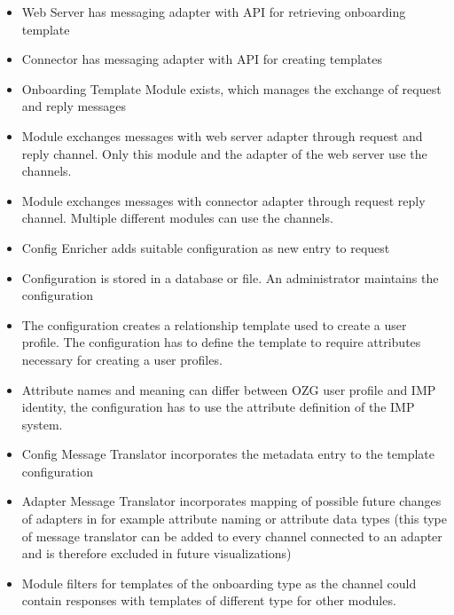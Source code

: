 \begin{itemize}
    \item Web Server has messaging adapter with API for retrieving onboarding template
    
    \item Connector has messaging adapter with API for creating templates
    
    \item Onboarding Template Module exists, which manages the exchange of request and reply messages
    
    \item Module exchanges messages with web server adapter through request and reply channel. Only this module and the adapter of the web server use the channels.
    
    \item Module exchanges messages with connector adapter through request reply channel. Multiple different modules can use the channels. 
    
    \item Config Enricher adds suitable configuration as new entry to request
    
    \item Configuration is stored in a database or file. An administrator maintains the configuration
    
    \item The configuration creates a relationship template used to create a user profile. The configuration has to define the template to require attributes necessary for creating a user profiles.
    
    \item Attribute names and meaning can differ between OZG user profile and IMP identity, the configuration has to use the attribute definition of the IMP system.

    \item Config Message Translator incorporates the metadata entry to the template configuration
    
    \item Adapter Message Translator incorporates mapping of possible future changes of adapters in for example attribute naming or attribute data types (this type of message translator can be added to every channel connected to an adapter and is therefore excluded in future visualizations)
    
    \item Module filters for templates of the onboarding type as the channel could contain responses with templates of different type for other modules.
    
\end{itemize}


